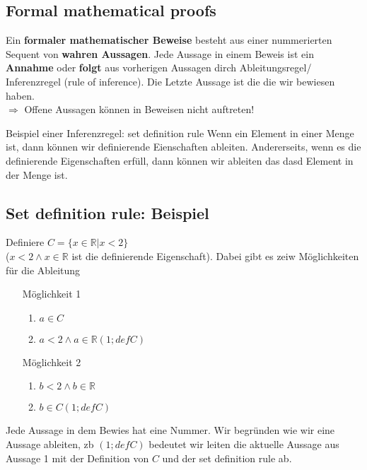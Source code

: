    \subsection{Formal mathematical proofs} 
        Ein \textbf{formaler mathematischer Beweise} besteht aus einer nummerierten Sequent von \textbf{wahren Aussagen}. Jede Aussage in einem Beweis ist ein \textbf{Annahme} oder \textbf{folgt} aus vorherigen Aussagen dirch Ableitungsregel/ Inferenzregel (rule of inference). Die Letzte Aussage ist die die wir bewiesen haben.\\ $\Rightarrow$ Offene Aussagen können in Beweisen nicht auftreten!

    {
        Beispiel einer Inferenzregel: set definition rule
    }
    {
        Wenn ein Element in einer Menge ist, dann können wir definierende Eienschaften ableiten. Andererseits, wenn es die definierende Eigenschaften erfüll, dann können wir ableiten das dasd Element in der Menge ist.
    }

    \subsection{Set definition rule: Beispiel} 
        Definiere $C = \{x \in \mathbb{R}\vert x < 2\}$ \\ ($x < 2 \land x \in \mathbb{R}$ ist die definierende Eigenschaft). Dabei gibt es zeiw Möglichkeiten für die Ableitung 
        \begin{itemize}
            \item [Möglichkeit 1] 
            \begin{enumerate}
                \item $a \in C$
                \item $a < 2 \land a \in \mathbb{R} (1; def C)$
            \end{enumerate}
            \item [Möglichkeit 2] 
            \begin{enumerate}
                \item $b < 2 \land b \in \mathbb{R} $
                \item $b \in C (1; def C)$
            \end{enumerate}
        \end{itemize}
        Jede Aussage in dem Bewies hat eine Nummer. Wir begründen wie wir eine Aussage ableiten, zb $(1; def C)$ bedeutet wir leiten die aktuelle Aussage aus Aussage 1 mit der Definition von $C$ und der set definition rule ab.

